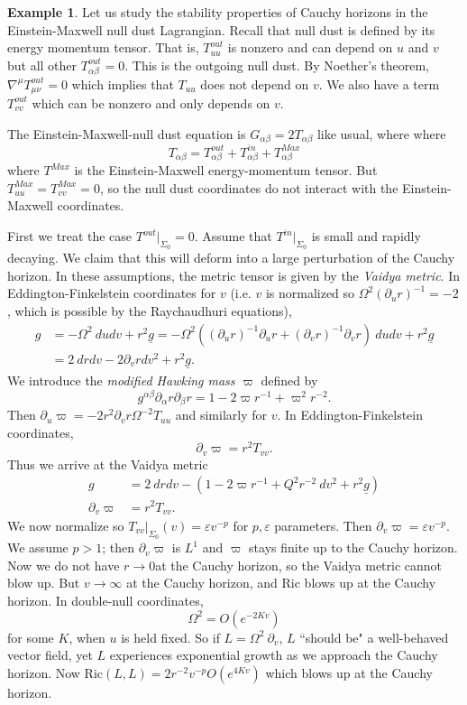 \documentclass[12pt]{report}
\newcommand{\Ric}{\text{Ric}}
\newcommand{\dfn}[1]{\emph{#1}\index{#1}}
\theoremstyle{definition}
\newtheorem{example}[theorem]{Example}
\theoremstyle{remark}
\begin{document}
\begin{example}
    Let us study the stability properties of Cauchy horizons in the Einstein-Maxwell null dust Lagrangian. Recall that null dust is defined by its energy momentum tensor. That is, $T_{uu}^{out}$ is nonzero and can depend on $u$ and $v$ but all other $T_{\alpha\beta}^{out} = 0$. This is the outgoing null dust. By Noether's theorem, $\nabla^\mu T_{\mu\nu}^{out} = 0$ which implies that $T_{uu}$ does not depend on $v$. We also have a term $T_{vv}^{out}$ which can be nonzero and only depends on $v$.

    The Einstein-Maxwell-null dust equation is $G_{\alpha\beta} = 2T_{\alpha\beta}$ like usual, where
    where
    $$T_{\alpha\beta} = T^{out}_{\alpha\beta} + T^{in}_{\alpha\beta} + T_{\alpha\beta}^{Max}$$
    where $T^{Max}$ is the Einstein-Maxwell energy-momentum tensor. But $T_{uu}^{Max} = T_{vv}^{Max} = 0$, so the null dust coordinates do not interact with the Einstein-Maxwell coordinates.

    First we treat the case $T^{out}|_{\Sigma_0} = 0$. Assume that $T^{in}|_{\Sigma_0}$ is small and rapidly decaying. We claim that this will deform into a large perturbation of the Cauchy horizon. In these assumptions, the metric tensor is given by the \dfn{Vaidya metric}. In Eddington-Finkelstein coordinates for $v$ (i.e. $v$ is normalized so $\Omega^2(\partial_ur)^{-1} = -2$, which is possible by the Raychaudhuri equations),
\begin{align*}
    g &= -\Omega^2 ~dudv + r^2\underline g = -\Omega^2((\partial_ur)^{-1} \partial_ur + (\partial_vr)^{-1} \partial_vr) ~dudv + r^2\underline g\\
        &= 2~drdv - 2\partial_vr dv^2 + r^2\underline g.
\end{align*}
    We introduce the \dfn{modified Hawking mass} $\varpi$ defined by
    $$g^{\alpha\beta} \partial_\alpha r \partial_\beta r = 1 -2\varpi r^{-1} + \varpi^2 r^{-2}.$$
    Then $\partial_u\varpi = -2r^2 \partial_vr\Omega^{-2} T_{uu}$ and similarly for $v$. In Eddington-Finkelstein coordinates,
    $$\partial_v \varpi = r^2 T_{vv}.$$
    Thus we arrive at the Vaidya metric
\begin{align*}
    g &= 2~drdv - (1 - 2\varpi r^{-1} + Q^2r^{-2} ~dv^2 + r^2\underline g)\\
    \partial_v\varpi &= r^2T_{vv}.
\end{align*}
    We now normalize so $T_{vv}|_{\Sigma_0}(v) = \varepsilon v^{-p}$ for $p,\varepsilon$ parameters. Then $\partial_v \varpi = \varepsilon v^{-p}$. We assume $p > 1$; then $\partial_v \varpi$ is $L^1$ and $\varpi$ stays finite up to the Cauchy horizon. Now we do not have $r \to 0$at the Cauchy horizon, so the Vaidya metric cannot blow up. But $v \to \infty$ at the Cauchy horizon, and $\Ric$ blows up at the Cauchy horizon. In double-null coordinates,
    $$\Omega^2 = O(e^{-2Kv})$$
    for some $K$, when $u$ is held fixed. So if $L = \Omega^2 ~\partial_v$, $L$ ``should be" a well-behaved vector field, yet $L$ experiences exponential growth as we approach the Cauchy horizon. Now $\Ric(L, L) = 2r^{-2}v^{-p} O(e^{4Kv})$ which blows up at the Cauchy horizon.


\end{example}
\end{document}
